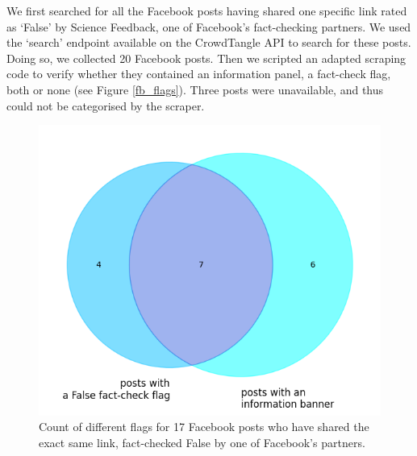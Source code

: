 \documentclass[Afour,sageh,times]{sagej}
\begin{document}
We first searched for all the Facebook posts having shared one specific link rated as ‘False’ by Science Feedback, one of Facebook's fact-checking partners. We used the `search' endpoint available on the CrowdTangle API to search for these posts.
Doing so, we collected 20 Facebook posts. 
Then we scripted an adapted scraping code to verify whether they contained an information panel, a fact-check flag, both or none (see Figure \ref{fb_flags}). 
Three posts were unavailable, and thus could not be categorised by the scraper. %

\begin{figure}[h]
\centering
\includegraphics[scale=0.4]{../figure/facebook_pie_flags_updated.png}
\caption{Count of different flags for 17 Facebook posts who have shared the exact same link, fact-checked False by one of Facebook’s partners. }
\label{tab_flags_fb}
\end{figure}
\end{document}
